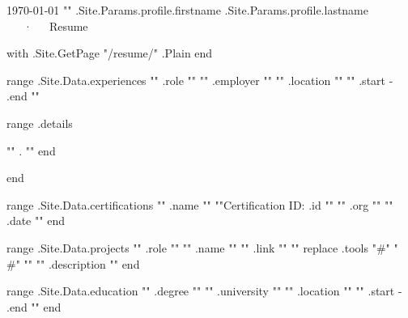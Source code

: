 \documentclass[11pt, letterpaper]{awesome-cv}
\begin{document}
\makecvheader[C]

\makecvfooter
  {\today}
  {{"{"}}{{ .Site.Params.profile.firstname }} {{ .Site.Params.profile.lastname }}~~~·~~~Resume}
  {\thepage}

\begin{cvparagraph}

{{ with .Site.GetPage "/resume/" }}{{ .Plain }}{{ end }}

\end{cvparagraph}

\begin{cventries}

{{ range .Site.Data.experiences }}
  \cventry
    {{"{"}}{{ .role }}{{"}"}}
    {{"{"}}{{ .employer }}{{"}"}}
    {{"{"}}{{ .location }}{{"}"}}
    {{"{"}}{{ .start }} - {{ .end }}{{"}"}}
    {
      \begin{cvitems}{{ range .details }}
        \item{{"{"}}{{ . }}{{"}"}}{{ end }}
      \end{cvitems}
    }

{{ end }}

\end{cventries}

\begin{cvhonors}
{{ range .Site.Data.certifications }}
  \cvhonor
    {{"{"}}{{ .name }}{{"}"}}
    {{"{"}}Certification ID: {{ .id }}{{"}"}}
    {{"{"}}{{ .org }}{{"}"}}
    {{"{"}}{{ .date }}{{"}"}}
{{ end }}

\end{cvhonors}

\begin{cventries}
{{ range .Site.Data.projects }}
  \cventry
    {{"{"}}{{ .role }}{{"}"}}
    {{"{"}}{{ .name }}{{"}"}}
    {{"{"}}{{ .link }}{{"}"}}
    {{"{"}}{{ replace .tools "#" "\\#" }}{{"}"}}
    {{"{"}}{{ .description }}{{"}"}}
{{ end }}

\end{cventries}

\begin{cventries}
{{ range .Site.Data.education }}
  \cventry
    {{"{"}}{{ .degree }}{{"}"}}
    {{"{"}}{{ .university }}{{"}"}}
    {{"{"}}{{ .location }}{{"}"}}
    {{"{"}}{{ .start }} - {{ .end }}{{"}"}}
    {
    }
{{ end }}

\end{cventries}

\end{document}
